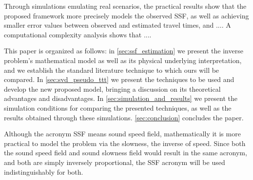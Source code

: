 Through simulations emulating real scenarios, the practical results show that the proposed framework more precisely models the observed SSF, as well as achieving smaller error values between observed and estimated travel times, and .... A computational complexity analysis shows that ....

This paper is organized as follows: in \cref{sec:ssf_estimation} we present the inverse problem's mathematical model as well as its physical underlying interpretation, and we establish the standard literature technique to which ours will be compared. In \cref{sec:svd_pseudo_ttt} we present the techniques to be used and develop the new proposed model, bringing a discussion on its theoretical advantages and disadvantages. In \cref{sec:simulation_and_results} we present the simulation conditions for comparing the presented techniques, as well as the results obtained through these simulations. \cref{sec:conclusion} concludes the paper.

Although the acronym SSF means sound speed field, mathematically it is more practical to model the problem via the slowness, the inverse of speed. Since both the sound speed field and sound slowness field would result in the same acronym, and both are simply inversely proportional, the SSF acronym will be used indistinguishably for both.
